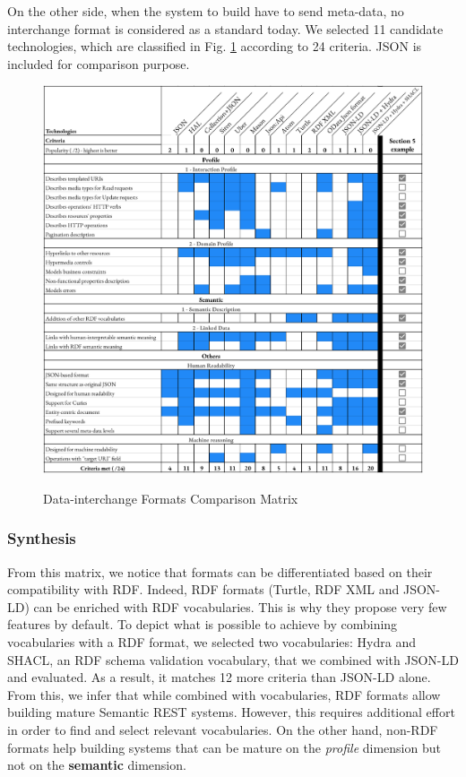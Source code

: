 On the other side, when the system to build have to send meta-data, no interchange format is considered as a standard today. We selected 11 candidate technologies, which are classified in Fig. \ref{interchange-formats-matrix} according to 24 criteria. JSON is included for comparison purpose.

\begin{figure}[!ht]
\caption{Data-interchange Formats Comparison Matrix}
\includegraphics[width=1\textwidth]{figures/DIF.png}
\label{interchange-formats-matrix}
\end{figure}

\subsubsection*{Synthesis}
From this matrix, we notice that formats can be differentiated based on their compatibility with RDF. Indeed, RDF formats (Turtle, RDF XML and JSON-LD) can be enriched with RDF vocabularies. This is why they propose very few features by default. To depict what is possible to achieve by combining vocabularies with a RDF format, we selected two vocabularies: Hydra and SHACL, an RDF schema validation vocabulary, that we combined with JSON-LD and evaluated. As a result, it matches 12 more criteria than JSON-LD alone.
From this, we infer that while combined with vocabularies, RDF formats allow building mature Semantic REST systems. However, this requires additional effort in order to find and select relevant vocabularies.
On the other hand, non-RDF formats help building systems that can be mature on the \textit{profile} dimension but not on the \textbf{semantic} dimension.

